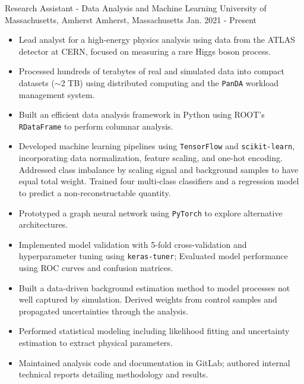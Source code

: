 

\begin{cventries}

  \cventry
  {Research Assistant - Data Analysis and Machine Learning} 
  {University of Massachusetts, Amherst} 
  {Amherst, Massachusetts} 
  {Jan. 2021 - Present} 
  {
    \begin{itemize}
      \item {Lead analyst for a high-energy physics analysis using data from the ATLAS detector at CERN, focused on measuring a rare Higgs boson process.}
      \item {Processed hundreds of terabytes of real and simulated data into compact datasets ($\sim$2 TB) using distributed computing and the \texttt{PanDA} workload management system.}
      \item {Built an efficient data analysis framework in Python using ROOT's \texttt{RDataFrame} to perform columnar analysis.}
      \item {Developed machine learning pipelines using \texttt{TensorFlow} and \texttt{scikit-learn}, incorporating data normalization, feature scaling, and one-hot encoding. Addressed class imbalance by scaling signal and background samples to have equal total weight. Trained four multi-class classifiers and a regression model to predict a non-reconstructable quantity.}
      \item {Prototyped a graph neural network using \texttt{PyTorch} to explore alternative architectures.}
      \item {Implemented model validation with 5-fold cross-validation and hyperparameter tuning using \texttt{keras-tuner}; Evaluated model performance using ROC curves and confusion matrices.}
      \item {Built a data-driven background estimation method to model processes not well captured by simulation. Derived weights from control samples and propagated uncertainties through the analysis.}
      \item {Performed statistical modeling including likelihood fitting and uncertainty estimation to extract physical parameters.}
      \item {Maintained analysis code and documentation in GitLab; authored internal technical reports detailing methodology and results.}
    \end{itemize}
  }


\end{cventries}
